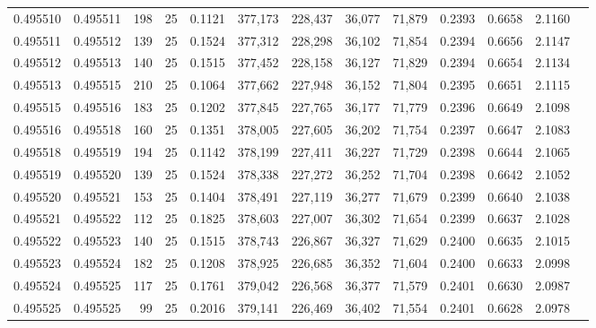\begin{tabular}{rrrrrrrrrrrrr}
0.495510 & 0.495511 &   198 &  25 &                                     0.1121 & 377,173 & 228,437 &  36,077 &  71,879 & 0.2393 & 0.6658 & 2.1160 \\
0.495511 & 0.495512 &   139 &  25 &                                     0.1524 & 377,312 & 228,298 &  36,102 &  71,854 & 0.2394 & 0.6656 & 2.1147 \\
0.495512 & 0.495513 &   140 &  25 &                                     0.1515 & 377,452 & 228,158 &  36,127 &  71,829 & 0.2394 & 0.6654 & 2.1134 \\
0.495513 & 0.495515 &   210 &  25 &                                     0.1064 & 377,662 & 227,948 &  36,152 &  71,804 & 0.2395 & 0.6651 & 2.1115 \\
0.495515 & 0.495516 &   183 &  25 &                                     0.1202 & 377,845 & 227,765 &  36,177 &  71,779 & 0.2396 & 0.6649 & 2.1098 \\
0.495516 & 0.495518 &   160 &  25 &                                     0.1351 & 378,005 & 227,605 &  36,202 &  71,754 & 0.2397 & 0.6647 & 2.1083 \\
0.495518 & 0.495519 &   194 &  25 &                                     0.1142 & 378,199 & 227,411 &  36,227 &  71,729 & 0.2398 & 0.6644 & 2.1065 \\
0.495519 & 0.495520 &   139 &  25 &                                     0.1524 & 378,338 & 227,272 &  36,252 &  71,704 & 0.2398 & 0.6642 & 2.1052 \\
0.495520 & 0.495521 &   153 &  25 &                                     0.1404 & 378,491 & 227,119 &  36,277 &  71,679 & 0.2399 & 0.6640 & 2.1038 \\
0.495521 & 0.495522 &   112 &  25 &                                     0.1825 & 378,603 & 227,007 &  36,302 &  71,654 & 0.2399 & 0.6637 & 2.1028 \\
0.495522 & 0.495523 &   140 &  25 &                                     0.1515 & 378,743 & 226,867 &  36,327 &  71,629 & 0.2400 & 0.6635 & 2.1015 \\
0.495523 & 0.495524 &   182 &  25 &                                     0.1208 & 378,925 & 226,685 &  36,352 &  71,604 & 0.2400 & 0.6633 & 2.0998 \\
0.495524 & 0.495525 &   117 &  25 &                                     0.1761 & 379,042 & 226,568 &  36,377 &  71,579 & 0.2401 & 0.6630 & 2.0987 \\
0.495525 & 0.495525 &    99 &  25 &                                     0.2016 & 379,141 & 226,469 &  36,402 &  71,554 & 0.2401 & 0.6628 & 2.0978 \\

\end{tabular}
